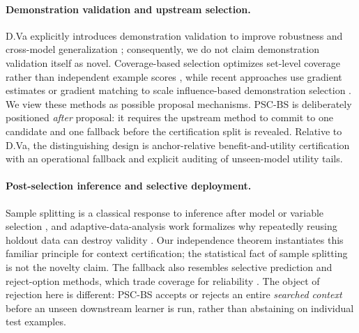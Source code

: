 \documentclass[10pt]{article}
\newcommand{\PSC}{\textsc{PSC-BS}}
\begin{document}
\paragraph{Demonstration validation and upstream selection.}
D.Va explicitly introduces demonstration validation to improve robustness and cross-model generalization \citep{zhang2025dva}; consequently, we do not claim demonstration validation itself as novel.
Coverage-based selection optimizes set-level coverage rather than independent example scores \citep{gupta2023coverage}, while recent approaches use gradient estimates or gradient matching to scale influence-based demonstration selection \citep{zzhang2025linear,jzhang2025gradient}.
We view these methods as possible proposal mechanisms.
\PSC{} is deliberately positioned \emph{after} proposal: it requires the upstream method to commit to one candidate and one fallback before the certification split is revealed.
Relative to D.Va, the distinguishing design is anchor-relative benefit-and-utility certification with an operational fallback and explicit auditing of unseen-model utility tails.

\paragraph{Post-selection inference and selective deployment.}
Sample splitting is a classical response to inference after model or variable selection \citep{kuchibhotla2022postselection}, and adaptive-data-analysis work formalizes why repeatedly reusing holdout data can destroy validity \citep{dwork2015reusable}.
Our independence theorem instantiates this familiar principle for context certification; the statistical fact of sample splitting is not the novelty claim.
The fallback also resembles selective prediction and reject-option methods, which trade coverage for reliability \citep{geifman2017selective}.
The object of rejection here is different: \PSC{} accepts or rejects an entire \emph{searched context} before an unseen downstream learner is run, rather than abstaining on individual test examples.
\end{document}
